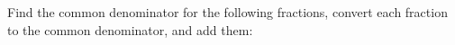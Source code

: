 \documentclass[12pt]{exam}%
\def\probskip{\vspace{2cm}}
\begin{document}
\begin{questions}
\begin{multicols}{2}
\end{multicols}

\break

\question[10] Find the common denominator for the following
fractions, convert each fraction to the common denominator, and add
them:

\begin{multicols}{2}
\end{multicols}
\end{questions}
\end{document}
